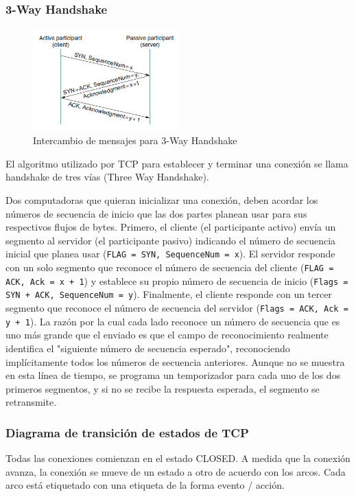 \subsubsection*{3-Way Handshake}
\begin{figure}[H]
	\centering
	\includegraphics[width=0.5\textwidth
]{images/three-way-handshake.png}
	\caption[Intercambio de mensajes para 3-Way Handshake]{Intercambio de mensajes para 3-Way Handshake}
	\label{fig:three-way-handshake}
\end{figure}
El algoritmo utilizado por TCP para establecer y terminar una conexión se llama handshake de tres vías (Three Way Handshake).

Dos computadoras que quieran inicializar una conexión, deben acordar los números de secuencia de inicio que las dos partes planean usar para sus respectivos flujos de bytes. Primero, el cliente (el participante activo) envía un segmento al servidor (el participante pasivo) indicando el número de secuencia inicial que planea usar (\texttt{FLAG = SYN, SequenceNum = x}). El servidor responde con un solo segmento que reconoce el número de secuencia del cliente (\texttt{FLAG = ACK, Ack = x + 1}) y establece su propio número de secuencia de inicio (\texttt{Flags = SYN + ACK, SequenceNum = y}). Finalmente, el cliente responde con un tercer segmento que reconoce el número de secuencia del servidor (\texttt{Flags = ACK, Ack = y + 1}). La razón por la cual cada lado reconoce un número de secuencia que es uno más grande que el enviado es que el campo de reconocimiento realmente identifica el "siguiente número de secuencia esperado", reconociendo implícitamente todos los números de secuencia anteriores. Aunque no se muestra en esta línea de tiempo, se programa un temporizador para cada uno de los dos primeros segmentos, y si no se recibe la respuesta esperada, el segmento se retransmite.

\subsubsection{Diagrama de transición de estados de TCP}
Todas las conexiones comienzan en el estado CLOSED. A medida que la conexión avanza, la conexión se mueve de un estado a otro de acuerdo con los arcos. Cada arco está etiquetado con una etiqueta de la forma evento / acción.

